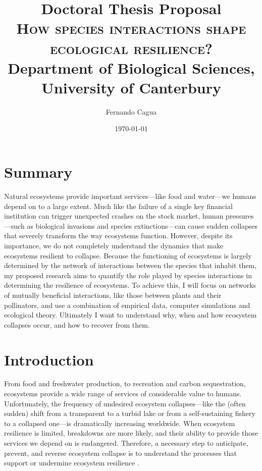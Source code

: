 \documentclass[a4paper]{report}
\title{
	{\large Doctoral Thesis Proposal} \\
	{\Huge \textsc{How species interactions shape ecological resilience?}} \\
	{\large Department of Biological Sciences, University of Canterbury}
}
\author{
  {\Large Fernando Cagua} \\
}
\date{\normalsize \today}
\begin{document}
\maketitle

\chapter*{Summary}

Natural ecosystems provide important services---like food and water---we humans depend on to a large extent.
Much like the failure of a single key financial institution can trigger unexpected crashes on the stock market, human pressures---such as biological invasions and species extinctions---can cause sudden collapses that severely transform the way ecosystems function.
However, despite its importance, we do not completely understand the dynamics that make ecosystems resilient to collapse.
Because the functioning of ecosystems is largely determined by the network of interactions between the species that inhabit them, my proposed research aims to quantify the role played by species interactions in determining the resilience of ecosystems.
To achieve this, I will focus on networks of mutually beneficial interactions, like those between plants and their pollinators, and use a combination of empirical data, computer simulations and ecological theory.
Ultimately I want to understand why, when and how ecosystem collapses occur, and how to recover from them.

\chapter*{Introduction}

From food and freshwater production, to recreation and carbon sequestration, ecosystems provide a wide range of services of considerable value to humans.
Unfortunately, the frequency of undesired ecosystem collapses---like the (often sudden) shift from a transparent to a turbid lake or from a self-sustaining fishery to a collapsed one---is dramatically increasing worldwide\citep{Scheffer2001a}.
When ecosystem resilience is limited, breakdowns are more likely, and their ability to provide those services we depend on is endangered.
Therefore, a necessary step to anticipate, prevent, and reverse ecosystem collapse is to understand the processes that support or undermine ecosystem resilience \citep{Hughes2005, Tylianakis2008}.
\end{document}

